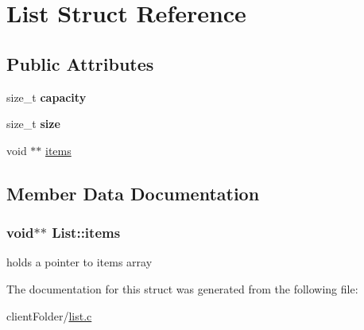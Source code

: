 \hypertarget{structList}{}\section{List Struct Reference}
\label{structList}
\subsection*{Public Attributes}
\begin{DoxyCompactItemize}
\item 
size\+\_\+t {\bfseries capacity}\hypertarget{structList_a12bdafe0a9c351d57e7c4222a2725d41}{}\label{structList_a12bdafe0a9c351d57e7c4222a2725d41}

\item 
size\+\_\+t {\bfseries size}\hypertarget{structList_a166530a166abd81afec0e6b0283f7e80}{}\label{structList_a166530a166abd81afec0e6b0283f7e80}

\item 
void $\ast$$\ast$ \hyperlink{structList_a200d7d33a9e1b63502a9403e11bfd45c}{items}
\end{DoxyCompactItemize}


\subsection{Member Data Documentation}
\subsubsection[{\texorpdfstring{items}{items}}]{\setlength{\rightskip}{0pt plus 5cm}void$\ast$$\ast$ List\+::items}\hypertarget{structList_a200d7d33a9e1b63502a9403e11bfd45c}{}\label{structList_a200d7d33a9e1b63502a9403e11bfd45c}
holds a pointer to items array 

The documentation for this struct was generated from the following file\+:\begin{DoxyCompactItemize}
\item 
client\+Folder/\hyperlink{list_8c}{list.\+c}\end{DoxyCompactItemize}
